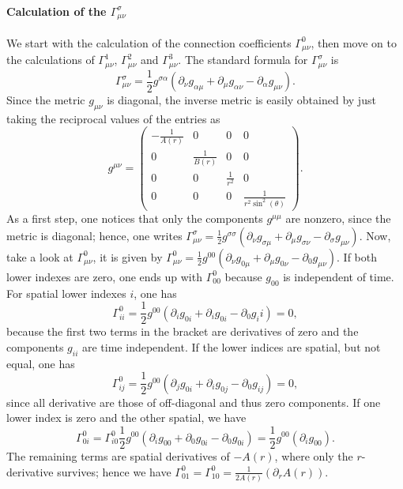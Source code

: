 \documentclass[a4paper,11pt]{article}
\numberwithin{equation}{section}
\begin{document}
{\paragraph{Calculation of the $\Gamma^\sigma_{\mu\nu}$}
We start with the calculation of the connection coefficients $\Gamma^0_{\mu\nu}$, then move on to the calculations of $\Gamma^1_{\mu\nu}$, $\Gamma^2_{\mu\nu}$ and $\Gamma^3_{\mu\nu}$. The standard formula for $\Gamma^\sigma_{\mu\nu}$ is \begin{equation}
	\Gamma^\sigma_{\mu\nu} = \frac{1}{2}g^{\sigma\alpha}\left(\partial_\nu g_{\alpha\mu}+\partial_\mu g_{\alpha\nu} - \partial_\alpha g_{\mu\nu}\right).
\end{equation} Since the metric $g_{\mu\nu}$ is diagonal, the inverse metric is easily obtained by just taking the reciprocal values of the entries as \begin{equation}
g^{\mu\nu} = \begin{pmatrix}
	-\frac{1}{A(r)} & 0 & 0 & 0 \\
	 0 & \frac{1}{B(r)} & 0 & 0 \\
	 0 & 0 & \frac{1}{r^2} & 0 \\
	 0 & 0 & 0 & \frac{1}{r^2\sin^2(\theta)}
\end{pmatrix}.
\end{equation} As a first step, one notices that only the components $g^{\mu\mu}$ are nonzero, since the metric is diagonal; hence, one writes $\Gamma^\sigma_{\mu\nu} = \frac{1}{2}g^{\sigma\sigma}\left(\partial_\nu g_{\sigma\mu}+\partial_\mu g_{\sigma\nu} - \partial_\sigma g_{\mu\nu}\right).$ Now, take a look at $\Gamma^0_{\mu\nu}$, it is given by $\Gamma^0_{\mu\nu} = \tfrac{1}{2}g^{00}\left(\partial_\nu g_{0\mu} + \partial_\mu g_{0\nu} - \partial_0 g_{\mu\nu}\right)$. If both lower indexes are zero, one ends up with $\Gamma^0_{00}$ because $g_{00}$ is independent of time. For spatial lower indexes $i$, one has \begin{equation}
\Gamma_{ii}^0 = \frac{1}{2}g^{00}\left(\partial_i g_{0i} + \partial_i g_{0i} - \partial_0 g_ii\right) = 0,
\end{equation} because the first two terms in the bracket are derivatives of zero and the components $g_{ii}$ are time independent. If the lower indices are spatial, but not equal, one has \begin{equation}
\Gamma^0_{ij} = \frac{1}{2}g^{00}\left(\partial_j g_{0i}+\partial_i g_{0j}-\partial_0 g_{ij}\right) = 0,
\end{equation} since all derivative are those of off-diagonal and thus zero components. If one lower index is zero and the other spatial, we have \begin{equation}
\Gamma^0_{0i} = \Gamma^0_{i0} \frac{1}{2}g^{00}\left(\partial_i g_{00} + \partial_0 g_{0i} - \partial_0 g_{0i}\right) = \frac{1}{2}g^{00}(\partial_i g_{00}).
\end{equation} The remaining terms are spatial derivatives of $-A(r)$, where only the $r$-derivative survives; hence we have $\Gamma^{0}_{01} = \Gamma^0_{10} = \frac{1}{2A(r)}(\partial_rA(r))$. %

}
\end{document}
